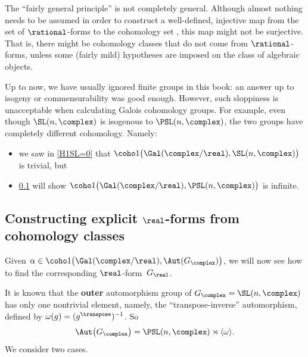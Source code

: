 \begin{warn} \label{NotGeneralWarn}
The ``fairly general principle''  is not completely general. Although almost nothing needs to be assumed in order to construct a well-defined, injective map from the set of $\rational$-forms to the cohomology set , this map might not be surjective. That is, there might be cohomology classes that do not come from $\rational$-forms, unless some (fairly mild) hypotheses are imposed on the class of algebraic objects.
\end{warn}

\begin{warn}
Up to now, we have usually ignored finite groups in this book: an answer up to isogeny or commensurability was good enough.  However, such sloppiness is unacceptable when calculating Galois cohomology groups. For example, even though $\SL(n,\complex)$ is isogenous to $\PSL(n,\complex)$, the two groups have completely different cohomology. Namely:
	\begin{itemize}
	\item we saw in \cref{H1SL=0} that $\coho1\bigl( \Gal(\complex/\real),  \SL(n,\complex) \bigr)$ is trivial,
	but
	\item \cref{RFormFromCoho} will show $\coho1\bigl( \Gal(\complex/\real),  \PSL(n,\complex) \bigr)$ is infinite.
	\end{itemize}
\end{warn}


\subsection{Constructing explicit $\real$-forms from cohomology classes} \label{RFormFromCoho}
Given $\alpha \in \coho1\bigl( \Gal(\complex/\real), \Aut ( G_{\complex} ) \bigr)$, we will now see how to find the corresponding $\real$-form~$G_\real$.

It is known that the \textbf{outer} automorphism group of $G_\complex = \SL(n,\complex)$ has only one nontrivial element, namely, the ``transpose-inverse'' automorphism, defined by $\omega(g) = (g^\transpose)^{-1}$. So
	$$ \Aut  \bigl( G_{\complex} \bigr) = \PSL(n,\complex) \rtimes \langle \omega \rangle .$$
We consider two cases.

\setcounter{case}{0}

